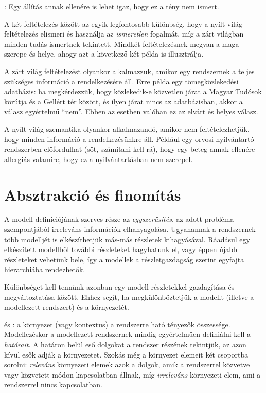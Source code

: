 \begin{definicio}
	: Egy állítás annak ellenére is lehet igaz, hogy ez a tény nem ismert.
\end{definicio}

A két feltételezés között az egyik legfontosabb különbség, hogy a nyílt világ feltételezés elismeri és használja az \emph{ismeretlen} fogalmát, míg a zárt világban minden tudás ismertnek tekintett. Mindkét feltételezésnek megvan a maga szerepe és helye, ahogy azt a következő két példa is illusztrálja.

\begin{pelda}
	A zárt világ feltételezést olyankor alkalmazzuk, amikor egy rendszernek a teljes szükséges információ a rendelkezésére áll. Erre példa egy tömegközlekedési adatbázis: ha megkérdezzük, hogy közlekedik-e közvetlen járat a Magyar Tudósok körútja és a Gellért tér között, és ilyen járat nincs az adatbázisban, akkor a válasz egyértelmű ``nem''. Ebben az esetben valóban ez az elvárt és helyes válasz.
	
	A nyílt világ szemantika olyankor alkalmazandó, amikor nem feltételezhetjük, hogy minden információ a rendelkezésünkre áll. Például egy orvosi nyilvántartó rendszerben előfordulhat (sőt, számítani kell rá), hogy egy beteg annak ellenére allergiás valamire, hogy ez a nyilvántartásban nem szerepel.
\end{pelda}

\section{Absztrakció és finomítás}

A modell definíciójának szerves része az \emph{egyszerűsítés}, az adott probléma szempontjából irreleváns információk elhanyagolása. Ugyanannak a rendszernek több modelljét is elkészíthetjük más-más részletek kihagyásával. Ráadásul egy elkészített modellből további részleteket hagyhatunk el, vagy éppen újabb részleteket vehetünk bele, így a modellek a részletgazdagság szerint egyfajta hierarchiába rendezhetők.

Különbséget kell tennünk azonban egy modell részletekkel gazdagítása és megváltoztatása között. Ehhez segít, ha megkülönböztetjük a modellt (illetve a modellezett rendszert) és a környezetét.

\begin{definicio}
	 és : a környezet (vagy kontextus) a rendszerre ható tényezők összessége. Modellezéskor a modellezett rendszernek mindig egyértelműen definiálni kell a \emph{határait}. A határon belül eső dolgokat a rendszer részének tekintjük, az azon kívül esők adják a környezetet. Szokás még a környezet elemeit két csoportba sorolni: \emph{releváns} környezeti elemek azok a dolgok, amik a rendszerrel közvetve vagy közvetett módon kapcsolatban állnak, míg \emph{irreleváns} környezeti elem, ami a rendszerrel nincs kapcsolatban.
\end{definicio}

